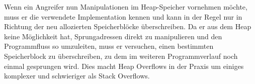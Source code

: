 Wenn ein Angreifer nun Manipulationen im Heap-Speicher vornehmen möchte, muss er die verwendete Implementation kennen 
und kann in der Regel nur in Richtung der neu allozierten Speicherblöcke überschreiben. Da er aus dem Heap keine Möglichkeit 
hat, Sprungadressen direkt zu manipulieren und den Programmfluss so umzuleiten, muss er versuchen, einen bestimmten 
Speicherblock zu überschreiben, zu dem im weiteren Programmverlauf noch einmal gesprungen wird. Dies macht Heap Overflows 
in der Praxis um einiges komplexer und schwieriger als Stack Overflows.

